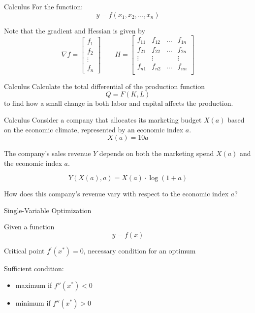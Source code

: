 \documentclass{./../../Latex/teaching_slides}
\begin{document}
\begin{frame}{Calculus}
For the function:
$$ y = f(x_1, x_2,...,x_n) $$ 
\vspace{1em}

Note that the gradient and Hessian is given by
$$ \nabla f = \begin{bmatrix}
	f_1 \\
	f_2 \\
	\vdots \\
	f_n
\end{bmatrix} \quad \quad
H = \begin{bmatrix}
	f_{11} & f_{12} & \hdots & f_{1n} \\
	f_{21} & f_{22} & \hdots & f_{2n} \\
	\vdots & \vdots & & \vdots \\
	f_{n1} & f_{n2} & \hdots & f_{nn} \\
\end{bmatrix} $$
\end{frame}

\begin{frame}{Calculus}
Calculate the total differential of the production function $$Q = F(K,L)$$ to find how a small change in both labor and capital affects the production.
\end{frame}


\begin{frame}{Calculus}
\vspace{-0.25em}
Consider a company that allocates its marketing budget \( X(a) \) based on the economic climate, represented by an economic index \( a \).
\[ X(a) = 10a \] \vspace{0.1em}

 The company's sales revenue \( Y \) depends on both the marketing spend \( X(a) \) and the economic index \( a \).

\[ Y(X(a), a) = X(a) \cdot \log(1 + a) \]  \vspace{0.1em}

How does this company's revenue vary with respect to the economic index $a$?
\end{frame}



\begin{frame}{Single-Variable Optimization}
\begin{witemize}
\item Given a function
$$ y = f(x) $$ 
  \item Critical point $f^{\prime}\left(x^*\right)=0$, necessary condition for an optimum
  \item Sufficient condition: \vspace{0.25em}
  \begin{itemize}
  \normalsize
  \item maximum if $f''(x^*)<0$
  \item minimum if $f''(x^*)>0$ \\~\\
\end{itemize}
\end{witemize}
\end{frame}
\end{document}
